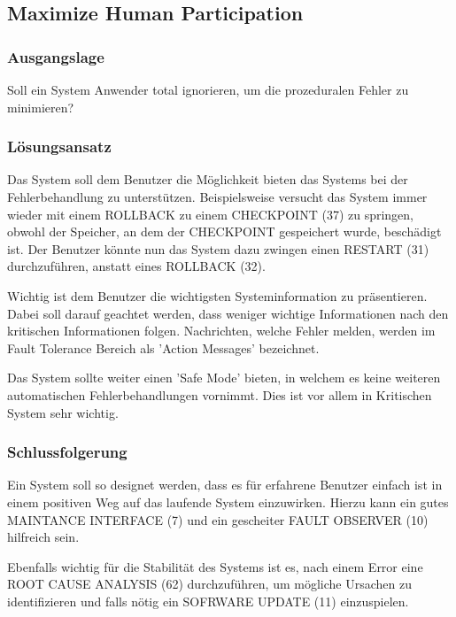 \subsection{Maximize Human Participation}

\subsubsection*{Ausgangslage}

Soll ein System Anwender total ignorieren, um die prozeduralen Fehler zu minimieren?

\subsubsection*{Lösungsansatz}

Das System soll dem Benutzer die Möglichkeit bieten das Systems bei der Fehlerbehandlung zu unterstützen. Beispielsweise versucht das System immer wieder mit einem ROLLBACK zu einem CHECKPOINT (37) zu springen, obwohl der Speicher, an dem der CHECKPOINT gespeichert wurde, beschädigt ist. Der Benutzer könnte nun das System dazu zwingen einen RESTART (31) durchzuführen, anstatt eines ROLLBACK (32).

Wichtig ist dem Benutzer die wichtigsten Systeminformation zu präsentieren. Dabei soll darauf geachtet werden, dass weniger wichtige Informationen nach den kritischen Informationen folgen. Nachrichten, welche Fehler melden, werden im Fault Tolerance Bereich als 'Action Messages' bezeichnet.

Das System sollte weiter einen 'Safe Mode' bieten, in welchem es keine weiteren automatischen Fehlerbehandlungen vornimmt. Dies ist vor allem in Kritischen System sehr wichtig.

\subsubsection*{Schlussfolgerung}

Ein System soll so designet werden, dass es für erfahrene Benutzer einfach ist in einem positiven Weg auf das laufende System einzuwirken. Hierzu kann ein gutes MAINTANCE INTERFACE (7) und ein gescheiter FAULT OBSERVER (10) hilfreich sein.

Ebenfalls wichtig für die Stabilität des Systems ist es, nach einem Error eine ROOT CAUSE ANALYSIS (62) durchzuführen, um mögliche Ursachen zu identifizieren und falls nötig ein SOFRWARE UPDATE (11) einzuspielen.
